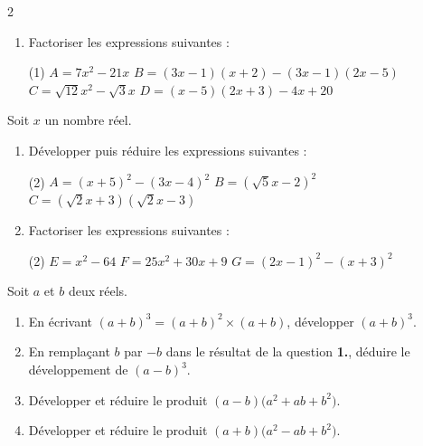 \documentclass[10pt, a4paper]{article}
\begin{document}
\begin{multicols*}{2}
\begin{Application}[][20 min]
\begin{enumerate}
    \item Factoriser les expressions suivantes :
    \begin{tasks}[label=$\bullet$, label-width=5pt, item-indent=15pt](1)
        \task $A = 7x^2 - 21x$
        \task $B = (3x - 1)(x + 2) - (3x - 1)(2x - 5)$
        \task $C = \sqrt{12}x^2 - \sqrt{3}x$
        \task $D = (x - 5)(2x + 3) - 4x + 20$
    \end{tasks}
\end{enumerate}
\end{Application}

\begin{Application}[][20 min]
Soit $x$ un nombre réel.
\begin{enumerate}
    \item Développer puis réduire les expressions suivantes :
    \begin{tasks}[label=$\bullet$, label-width=5pt, item-indent=15pt](2)
        \task $A = (x + 5)^2  - (3x - 4)^2$
        \task $B = (\sqrt{5}x - 2)^2$
        \task $C = (\sqrt{2}x + 3)(\sqrt{2}x - 3)$
    \end{tasks}

    \item Factoriser les expressions suivantes  :
    \begin{tasks}[label=$\bullet$, label-width=5pt, item-indent=15pt](2)
        \task $E = x^2 - 64$
        \task $F = 25x^2 + 30x + 9$
        \task $G = (2x - 1)^2 - (x + 3)^2$
    \end{tasks}

\end{enumerate}
\end{Application}

\begin{Activite}[][20 min]
Soit $a$ et $b$ deux réels.
\begin{enumerate}
    \item En écrivant $(a+b)^3 = (a+b)^2 \times (a+b)$, développer $(a+b)^3$.
    
    \item En remplaçant $b$ par $-b$ dans le résultat de la question \textbf{1.}, déduire le développement de $(a-b)^3$.
\end{enumerate}

\begin{enumerate}
    \setcounter{enumi}{2}
    \item Développer et réduire le produit $(a-b)\big(a^2 + ab + b^2\big)$.
    
    \item Développer et réduire le produit $(a+b)\big(a^2 - ab + b^2\big)$.
    

\end{enumerate}
\end{Activite}
\end{multicols*}
\end{document}
